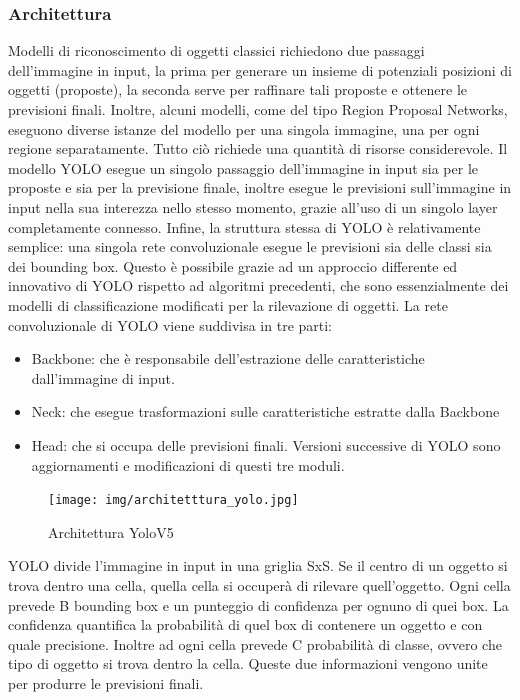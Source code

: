 \documentclass{article}
\begin{document}
    \subsubsection{Architettura}
    \cite{yolotutorial}  \cite{yoloarch}
    Modelli di riconoscimento di oggetti classici richiedono due passaggi dell'immagine in input, la prima per generare un insieme di potenziali posizioni di oggetti (proposte), la seconda serve per raffinare tali proposte e ottenere le previsioni finali.
    Inoltre, alcuni modelli, come del tipo Region Proposal Networks, eseguono diverse istanze del modello per una singola immagine, una per ogni regione separatamente. Tutto ciò richiede una quantità di risorse considerevole.
    Il modello YOLO esegue un singolo passaggio dell'immagine in input sia per le proposte e sia per la previsione finale, inoltre esegue le previsioni sull'immagine in input nella sua interezza nello stesso momento, grazie all'uso di un singolo layer completamente connesso. 
    Infine, la struttura stessa di YOLO è relativamente semplice: una singola rete convoluzionale esegue le previsioni sia delle classi sia dei bounding box. Questo è possibile grazie ad un approccio differente ed innovativo di YOLO rispetto ad algoritmi precedenti, che sono essenzialmente dei modelli di classificazione modificati per la rilevazione di oggetti.
    La rete convoluzionale di YOLO viene suddivisa in tre parti: 
    \begin{itemize}
        \item Backbone: che è responsabile dell'estrazione delle caratteristiche dall'immagine di input.
        \item Neck: che esegue trasformazioni sulle caratteristiche estratte dalla Backbone
        \item Head: che si occupa delle previsioni finali.
    Versioni successive di YOLO sono aggiornamenti e modificazioni di questi tre moduli.
    \end{itemize}
    
\begin{figure}[h!]
    \centering
    \texttt{[image: img/architetttura\_yolo.jpg]}
    \caption{Architettura YoloV5}
\end{figure}

\newpage
YOLO divide l'immagine in input in una griglia SxS. Se il centro di un oggetto si trova dentro una cella, quella cella si occuperà di rilevare quell'oggetto.
Ogni cella prevede B bounding box e un punteggio di confidenza per ognuno di quei box. La confidenza quantifica la probabilità di quel box di contenere un oggetto e con quale precisione. Inoltre ad ogni cella prevede C probabilità di classe, ovvero che tipo di oggetto si trova dentro la cella. 
Queste due informazioni vengono unite per produrre le previsioni finali.
\end{document}
